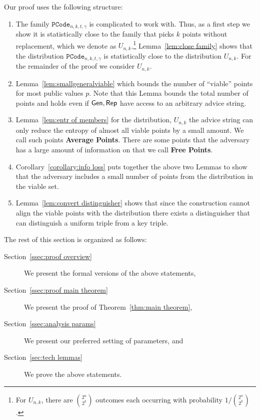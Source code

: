 Our proof uses the following structure:
\begin{enumerate}

\item The family $\mathtt{PCode}_{n, k, t, \gamma}$ is complicated to work with.  Thus, as a first step we show it is statistically close to the family that picks $k$ points without replacement, which we denote as $U_{n,k}$.\footnote{For $U_{n,k}$, there are ${2^{n}\choose 2^k}$ outcomes each occurring with probability $1/{2^{n}\choose 2^k}$.}  Lemma~\ref{lem:close family} shows that the distribution $\mathtt{PCode}_{n, k, t, \gamma}$ is statistically close to the distribution $U_{n,k}$.  For the remainder of the proof we consider $U_{n,k}$.
\item Lemma~\ref{lem:smallgeneralviable} which bounds the number of ``viable'' points for most public values $p$.  Note that this Lemma bounds the total number of points and holds even if ${\mathsf{Gen}}, {\mathsf{Rep}}$ have access to an arbitrary advice string. 

\item Lemma~\ref{lem:entr of members} for the distribution, $U_{n,k}$ the advice string can only reduce the entropy of almost all viable points by a small amount. We call such points \textbf{Average Points}.  There are some points that the adversary has a large amount of information on that we call \textbf{Free Points}.

\item Corollary~\ref{corollary:info loss} puts together the above two Lemmas to show that the adversary includes a small number of points from the distribution in the viable set.

\item Lemma~\ref{lem:convert distinguisher} shows that since the construction cannot align the viable points with the distribution there exists a distinguisher that can distinguish a uniform triple from a key triple. 
\end{enumerate}

\noindent
The rest of this section is organized as follows:
\begin{description}
\item[Section~\ref{ssec:proof overview}] We present the formal versions of the above statements,
\item[Section~\ref{ssec:proof main theorem}] We present the proof of Theorem~\ref{thm:main theorem}, 
\item[Section~\ref{ssec:analysis params}] We present our preferred setting of parameters, and
\item[Section~\ref{sec:tech lemmas}] We prove the above statements.
\end{description}

